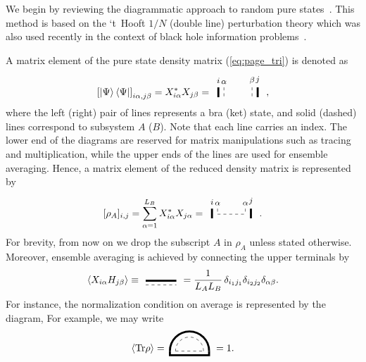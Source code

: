 \documentclass[aps,pra,groupedaddress,twocolumn,notitlepage,superscriptaddress,10pt]{revtex4-1}
\newcommand{\Tr}{\text{Tr}}
\begin{document}
We begin by reviewing the diagrammatic approach to random pure states~\cite{Jurkiewicz,Zee1995}. This method is based on the `t~Hooft $1/N$ (double line) perturbation theory which was also used recently in the context of black hole information problems~\cite{Shenker2019}.

A matrix element of the pure state density matrix (\ref{eq:page_tri}) is denoted as
\begin{align}
    \left[\ket{\Psi}\bra{\Psi}\right]_{i\alpha,j\beta}= X_{i\alpha}^\ast X_{j\beta}
    =%
    \,
    \tikz[baseline=-0.5ex]{
    \draw[dashed] (0,0.2) node[align=center, above] {\footnotesize $\alpha$} -- (0,-0.2);
    \draw[dashed] (1,0.2) node[align=center, above] {\footnotesize $\beta$} -- (1,-0.2);
    \draw[line width=2] (-0.2,0.2) node[align=center, above] {\footnotesize $i$} -- (-0.2,-0.15);
    \draw[line width=2] (1.2,0.2) node[align=center, above] {\footnotesize $j$} -- (1.2,-0.15);
    }\ ,
\end{align}
where the left (right) pair of lines represents a bra (ket) state, and solid (dashed) lines correspond to subsystem $A$ ($B$). Note that each line carries an index. The lower end of the diagrams are reserved for matrix manipulations such as tracing and multiplication, while the upper ends of the lines are used for ensemble averaging.
Hence, a matrix element of the reduced density matrix is represented by
\begin{align}
    \label{eq:rho_diag}
    [\rho_A]_{i,j}= 
    {\sum_{\alpha=1}^{L_B} X_{i\alpha}^\ast X_{j\alpha}}
= %
\,
    \tikz[baseline=-0.5ex]{
    \draw[dashed] (0,0.2) node[align=center, above] {\footnotesize $\alpha$} -- (0,0);
    \draw[dashed] (0,0)  -- (1,0);
    \draw[dashed]  (1,0.2) node[align=center, above] {\footnotesize $\alpha$} -- (1,0);
    \draw[line width=2] (-0.2,0.2) node[align=center, above] {\footnotesize $i$} -- (-0.2,-0.15);
    \draw[line width=2] (1.2,0.2) node[align=center, above] {\footnotesize $j$} -- (1.2,-0.15);
    }\ .
\end{align}
For brevity, from now on we drop the subscript $A$ in $\rho_A$ unless stated otherwise.
Moreover, ensemble averaging is achieved by connecting the upper terminals by
\begin{align}
\braket{X_{i \alpha} H_{j \beta}} \equiv
\
\tikz[baseline=-0.8ex,scale=1]{
    \draw[line width=2] (0,-0.05)--(1.1,-0.05);
    \draw[dashed] (0,-0.2)--(1.1,-0.2);
    }
    \ 
    =\frac{1}{L_{A} L_B}\, \delta_{i_1 j_1} \delta_{i_2 j_2} \delta_{\alpha\beta}.
\end{align} 
For instance, the normalization condition on average is represented by the diagram,
For example, we may write
\begin{align}
    \braket{\Tr\rho}=
    \,
    \tikz[baseline=0ex]{
    \draw[dashed] (1.0,0) arc (0:180:0.5);
    \draw[dashed] (0,0) -- (1,0);
    \draw[line width=2] (1.2,0.) arc (0:180:0.7);
    \draw[line width=2] (-0.2,0.0)-- (-0.2,-0.15)--(1.2,-0.15)-- (1.2,0.0);
    }\ = 1.
\end{align}
\end{document}
